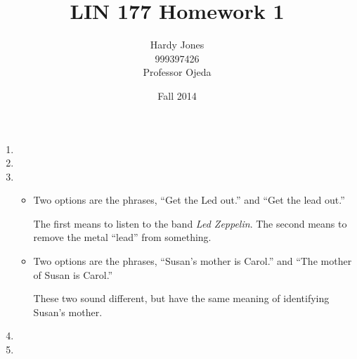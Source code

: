 \documentclass[12pt,letterpaper]{article}
\title{LIN 177 Homework 1\vspace{-2ex}}
\author{Hardy Jones\\
        999397426\\
        Professor Ojeda\vspace{-2ex}}
\date{Fall 2014}
\begin{document}
  \maketitle


  \begin{enumerate}
    \item

    \item

    \item
      \begin{itemize}
        \item
          Two options are the phrases, ``Get the Led out.'' and ``Get the lead out.''

          The first means to listen to the band \textit{Led Zeppelin}.
          The second means to remove the metal ``lead'' from something.

        \item
          Two options are the phrases, ``Susan's mother is Carol.'' and ``The mother of Susan is Carol.''

          These two sound different, but have the same meaning of identifying Susan's mother.
      \end{itemize}

    \pagebreak

    \item

    \item
  \end{enumerate}
\end{document}
